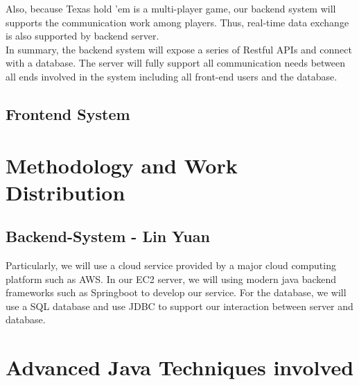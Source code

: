 \documentclass{article}
\begin{document}
Also, because Texas hold 'em is a multi-player game, our backend system will supports the communication work among players. Thus, real-time data exchange is also supported by backend server.\\

In summary, the backend system will expose a series of Restful APIs and connect with a database. The server will fully support all communication needs between all ends involved in the system including all front-end users and the database. 
\subsection{Frontend System}
\section{Methodology and Work Distribution}
\subsection{Backend-System - Lin Yuan}
Particularly, we will use a cloud service provided by a major cloud computing platform such as AWS. In our EC2 server, we will using modern java backend frameworks such as Springboot to develop our service. For the database, we will use a SQL database and use JDBC to support our interaction between server and database.
\section{Advanced Java Techniques involved}


\end{document}
